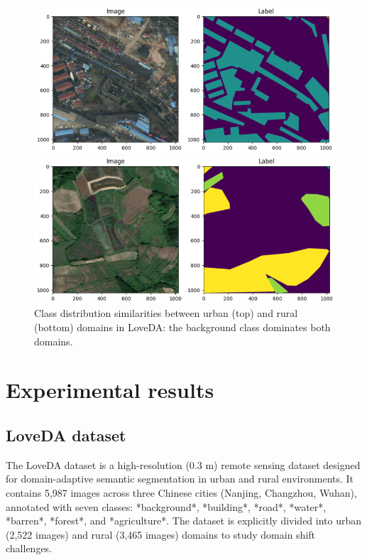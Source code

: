 \documentclass{article}
\begin{document}
\begin{multicols}{2}
		\begin{figure}[H]  

			\centering
			\begin{minipage}{1\linewidth}
				\centering
				\includegraphics[width=1\linewidth]{image/urban+mask4.png}
				
			\end{minipage}
			\begin{minipage}{1\linewidth}
				\centering
				\includegraphics[width=1\linewidth]{image/rural+mask4.png}
				
			\end{minipage}
			\caption{Class distribution similarities between urban (top) and rural (bottom) domains in LoveDA: the background class dominates both domains.}  
			\label{fig:class_eug}  

		\end{figure}



		\section{Experimental results}

		\subsection{LoveDA dataset}  
		The LoveDA dataset \cite{loveda2021} is a high-resolution (0.3 m) remote sensing dataset designed for domain-adaptive semantic segmentation in urban and rural environments. It contains 5,987 images across three Chinese cities (Nanjing, Changzhou, Wuhan), annotated with seven classes: *background*, *building*, *road*, *water*, *barren*, *forest*, and *agriculture*. The dataset is explicitly divided into urban (2,522 images) and rural (3,465 images) domains to study domain shift challenges.  
		

\end{multicols}
\end{document}
